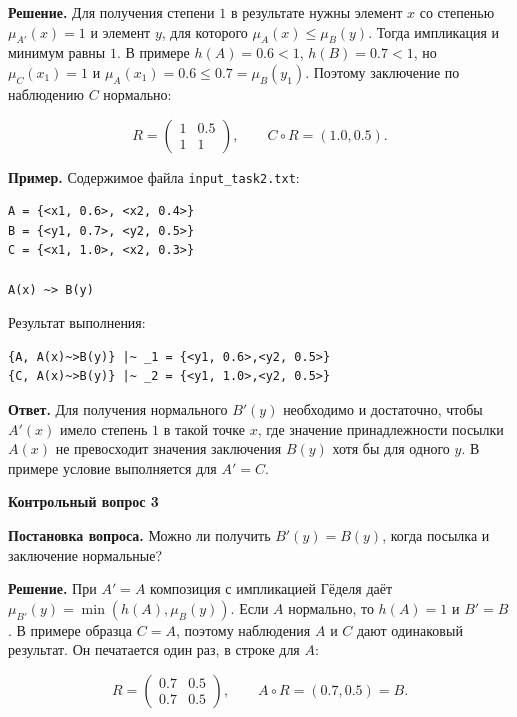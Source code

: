 \documentclass[14pt,a4paper]{extarticle}
\newcommand{\reportheading}[1]{\par\vspace{0.8\baselineskip}\noindent\textbf{#1}\par\nobreak\vspace{0.35\baselineskip}\nobreak}
\begin{document}
\smallskip\noindent\textbf{Решение.} Для получения степени $1$ в результате нужны элемент $x$ со степенью $\mu_{A'}(x)=1$ и элемент $y$, для которого $\mu_A(x)\leq\mu_B(y)$. Тогда импликация и минимум равны $1$. В примере $h(A)=0.6<1$, $h(B)=0.7<1$, но $\mu_C(x_1)=1$ и $\mu_A(x_1)=0.6\leq0.7=\mu_B(y_1)$. Поэтому заключение по наблюдению $C$ нормально:

\[
R=\begin{pmatrix}1&0.5\\1&1\end{pmatrix},\qquad C\circ R=(1.0,0.5).
\]

\noindent\textbf{Пример.} Содержимое файла \texttt{input\_task2.txt}:

\begin{Verbatim}[fontsize=\small,baselinestretch=1,frame=single,breaklines=true]
A = {<x1, 0.6>, <x2, 0.4>}
B = {<y1, 0.7>, <y2, 0.5>}
C = {<x1, 1.0>, <x2, 0.3>}

A(x) ~> B(y)
\end{Verbatim}

\noindent Результат выполнения:

\begin{Verbatim}[fontsize=\small,baselinestretch=1,frame=single,breaklines=true]
{A, A(x)~>B(y)} |~ _1 = {<y1, 0.6>,<y2, 0.5>}
{C, A(x)~>B(y)} |~ _2 = {<y1, 1.0>,<y2, 0.5>}
\end{Verbatim}

\smallskip\noindent\textbf{Ответ.} Для получения нормального $B'(y)$ необходимо и достаточно, чтобы $A'(x)$ имело степень $1$ в такой точке $x$, где значение принадлежности посылки $A(x)$ не превосходит значения заключения $B(y)$ хотя бы для одного $y$. В примере условие выполняется для $A'=C$.


\clearpage
\reportheading{Контрольный вопрос 3}

\noindent\textbf{Постановка вопроса.} Можно ли получить $B'(y)=B(y)$, когда посылка и заключение нормальные?

\smallskip\noindent\textbf{Решение.} При $A'=A$ композиция с импликацией Гёделя даёт $\mu_{B'}(y)=\min(h(A),\mu_B(y))$. Если $A$ нормально, то $h(A)=1$ и $B'=B$. В примере образца $C=A$, поэтому наблюдения $A$ и $C$ дают одинаковый результат. Он печатается один раз, в строке для $A$:

\[
R=\begin{pmatrix}0.7&0.5\\0.7&0.5\end{pmatrix},\qquad A\circ R=(0.7,0.5)=B.
\]
\end{document}

